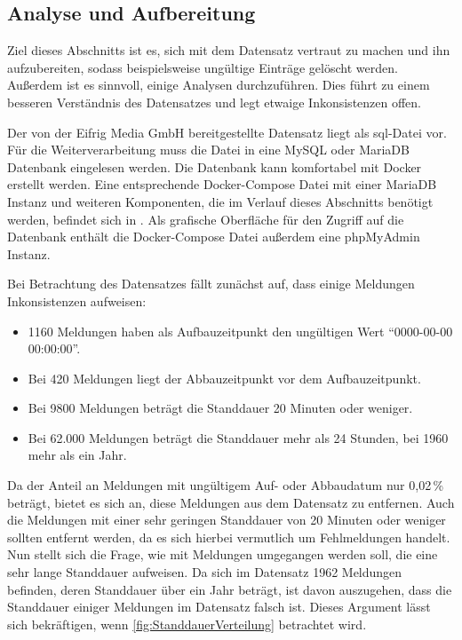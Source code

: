 \subsection{Analyse und Aufbereitung}
\label{sec:AnalyseAufbereitung}

Ziel dieses Abschnitts ist es, sich mit dem Datensatz vertraut zu machen und ihn aufzubereiten, sodass beispielsweise ungültige Einträge gelöscht werden.
Außerdem ist es sinnvoll, einige Analysen durchzuführen.
Dies führt zu einem besseren Verständnis des Datensatzes und legt etwaige Inkonsistenzen offen.

Der von der Eifrig Media GmbH bereitgestellte Datensatz liegt als sql-Datei vor.
Für die Weiterverarbeitung muss die Datei in eine MySQL oder MariaDB Datenbank eingelesen werden.
Die Datenbank kann komfortabel mit Docker erstellt werden.
Eine entsprechende Docker-Compose Datei mit einer MariaDB Instanz und weiteren Komponenten, die im Verlauf dieses Abschnitts benötigt werden, befindet sich in .
Als grafische Oberfläche für den Zugriff auf die Datenbank enthält die Docker-Compose Datei außerdem eine phpMyAdmin Instanz.

Bei Betrachtung des Datensatzes fällt zunächst auf, dass einige Meldungen Inkonsistenzen aufweisen:

\begin{itemize}
    \setlength\itemsep{-15pt}
    \item 1160 Meldungen haben als Aufbauzeitpunkt den ungültigen Wert "`0000-00-00 00:00:00"'.
    \item Bei 420 Meldungen liegt der Abbauzeitpunkt vor dem Aufbauzeitpunkt.
    \item Bei 9800 Meldungen beträgt die Standdauer 20 Minuten oder weniger.
    \item Bei 62.000 Meldungen beträgt die Standdauer mehr als 24 Stunden, bei 1960 mehr als ein Jahr.
\end{itemize}

Da der Anteil an Meldungen mit ungültigem Auf- oder Abbaudatum nur 0,02\,\% beträgt, bietet es sich an, diese Meldungen aus dem Datensatz zu entfernen.
Auch die Meldungen mit einer sehr geringen Standdauer von 20 Minuten oder weniger sollten entfernt werden, da es sich hierbei vermutlich um Fehlmeldungen handelt.
Nun stellt sich die Frage, wie mit Meldungen umgegangen werden soll, die eine sehr lange Standdauer aufweisen.
Da sich im Datensatz 1962 Meldungen befinden, deren Standdauer über ein Jahr beträgt, ist davon auszugehen, dass die Standdauer einiger Meldungen im Datensatz falsch ist.
Dieses Argument lässt sich bekräftigen, wenn \autoref{fig:StanddauerVerteilung} betrachtet wird.

